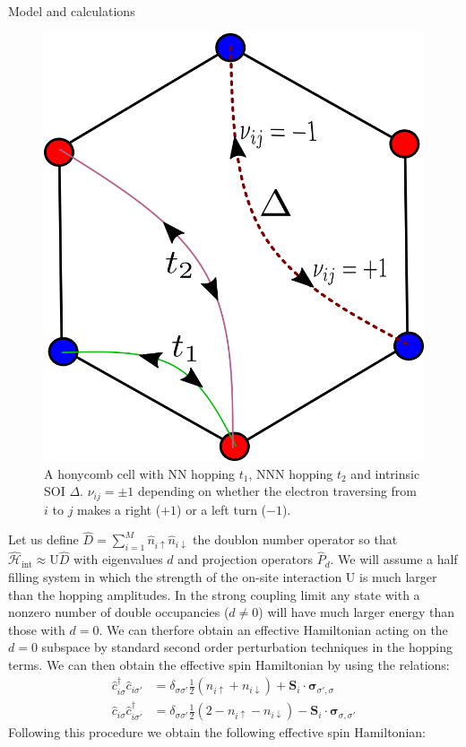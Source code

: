 \documentclass[aps,prl,twocolumn,amsmath,amssymb,superscriptaddress,nobibnotes]{revtex4}%
\newcommand{\bs}{\boldsymbol}
\begin{document}
\begin{section}{Model and calculations}
\begin{figure}[t]
\includegraphics[width=0.6\columnwidth]{../Figures/kmh.png}
\caption{A honycomb cell with NN hopping $t_1$, NNN hopping $t_2$ and intrinsic SOI $\Delta$. $\nu_{ij} = \pm 1$ depending on whether the electron traversing from $i$ to $j$ makes a right ($+1$) or a left turn ($-1$).}
\label{fig1}
\vspace*{-6pt}
\end{figure}
Let us define $\hat{D} = \sum_{i=1}^M \hat{n}_{i\uparrow}\hat{n}_{i\downarrow}$ the doublon number operator so that $\hat{\mathcal{H}}_{\text{int}} \approx \text{U}\hat{D}$ with eigenvalues $d$ and projection operators $\hat{P}_d$. We will assume a half filling system in which the strength of the on-site interaction $\text{U}$ is much larger than the hopping amplitudes. In the strong coupling limit any state with a nonzero number of double occupancies ($d \neq 0$) will have much larger energy than those with $d=0$. We can therfore obtain an effective Hamiltonian acting on the $d=0$ subspace by standard second order perturbation techniques in the hopping terms. We can then obtain the effective spin Hamiltonian by using the relations:
\begin{align}
\hat{c}_{i \sigma}^\dagger \hat{c}_{i \sigma'} &= \delta_{\sigma \sigma'} \frac{1}{2} (n_{i \uparrow} + n_{i \downarrow}) + \bs{S}_i\cdot\bs{\sigma}_{\sigma', \sigma} \label{SpinOperatorInv1}\\ 
\hat{c}_{i \sigma} \hat{c}_{i \sigma'}^\dagger &= \delta_{\sigma \sigma'} \frac{1}{2} (2 - n_{i \uparrow} - n_{i \downarrow}) - \bs{S}_i\cdot\bs{\sigma}_{\sigma, \sigma'} \label{SpinOperatorInv2}
\end{align}
Following this procedure we obtain the following effective spin Hamiltonian:


\end{section}
\end{document}
